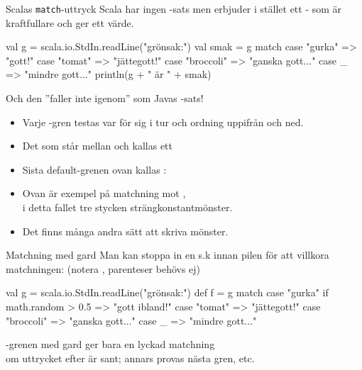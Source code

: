 \begin{Slide}{Scalas \texttt{match}-uttryck}\SlideFontSmall
Scala har ingen -sats men erbjuder i stället ett - som är kraftfullare och ger ett värde.

\begin{Code}
val g = scala.io.StdIn.readLine("grönsak:")
val smak = g match {
  case "gurka" => "gott!"
  case "tomat" => "jättegott!"
  case "broccoli" => "ganska gott..."
  case _ => "mindre gott..."
}
println(g + " är " + smak)
\end{Code}
Och den ''faller inte igenom'' som Javas -sats! 
\begin{itemize}
\pause\item Varje -gren testas var för sig i tur och ordning uppifrån och ned.
\pause\item Det som står mellan  och \code{=>} kallas ett  
\pause\item Sista default-grenen ovan kallas :  
\pause\item Ovan är exempel på matchning mot , \\ i detta fallet tre stycken strängkonstantmönster.
\pause\item Det finns många andra sätt att skriva mönster.
\end{itemize}
\end{Slide}



\begin{Slide}{Matchning med gard}
Man kan stoppa in en s.k   innan pilen \code{=>} för att villkora matchningen: (notera , parenteser behövs ej)
\begin{Code}
val g = scala.io.StdIn.readLine("grönsak:")
def f = g match {
  case "gurka" if math.random > 0.5 => "gott ibland!"
  case "tomat" => "jättegott!"
  case "broccoli" => "ganska gott..."
  case _ => "mindre gott..."
}
\end{Code}
-grenen med gard ger bara en lyckad matchning \\ om uttrycket efter  är sant; annars provas nästa gren, etc.
\end{Slide}

